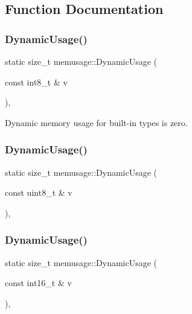 \subsection{Function Documentation}
\mbox{\label{namespacememusage_a24d4e7ba4b087b7c854e819c37e20ea0}} 
\subsubsection{\texorpdfstring{Dynamic\+Usage()}{DynamicUsage()}\hspace{0.1cm}{\footnotesize\ttfamily [1/18]}}
{\footnotesize\ttfamily static size\+\_\+t memusage\+::\+Dynamic\+Usage (\begin{DoxyParamCaption}\item[{const int8\+\_\+t \&}]{v }\end{DoxyParamCaption})\hspace{0.3cm}{\ttfamily [inline]}, {\ttfamily [static]}}

Dynamic memory usage for built-\/in types is zero. \mbox{\label{namespacememusage_acf15bdba7e4327aa5d5d1fe71eca19a3}} 
\subsubsection{\texorpdfstring{Dynamic\+Usage()}{DynamicUsage()}\hspace{0.1cm}{\footnotesize\ttfamily [2/18]}}
{\footnotesize\ttfamily static size\+\_\+t memusage\+::\+Dynamic\+Usage (\begin{DoxyParamCaption}\item[{const uint8\+\_\+t \&}]{v }\end{DoxyParamCaption})\hspace{0.3cm}{\ttfamily [inline]}, {\ttfamily [static]}}

\mbox{\label{namespacememusage_acdf1e4b51f6362bd060fb640da9f1992}} 
\subsubsection{\texorpdfstring{Dynamic\+Usage()}{DynamicUsage()}\hspace{0.1cm}{\footnotesize\ttfamily [3/18]}}
{\footnotesize\ttfamily static size\+\_\+t memusage\+::\+Dynamic\+Usage (\begin{DoxyParamCaption}\item[{const int16\+\_\+t \&}]{v }\end{DoxyParamCaption})\hspace{0.3cm}{\ttfamily [inline]}, {\ttfamily [static]}}

